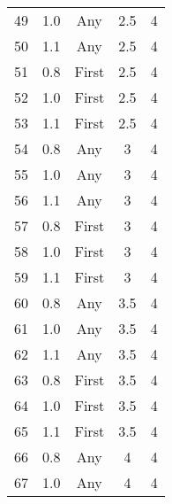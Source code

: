 \begin{table}[H]
{\begin{tabular}{ccccc}
      49                &  1.0  & Any     &     2.5                           & 4                    \\ 
      50                &  1.1  & Any     &     2.5                           & 4                     \\ 
      51                &  0.8  & First   &     2.5                           & 4                   \\ 
      52                &  1.0  & First   &     2.5                           & 4                   \\ 
      53                &  1.1  & First   &     2.5                           & 4                   \\ 
      54                &  0.8  & Any     &     3                           & 4                    \\ 
      55                &  1.0  & Any     &     3                           & 4                    \\ 
      56                &  1.1  & Any     &     3                           & 4                     \\ 
      57                &  0.8  & First   &     3                           & 4                   \\ 
      58                &  1.0  & First   &     3                           & 4                   \\ 
      59                &  1.1  & First   &     3                           & 4                   \\ 
      60                &  0.8  & Any     &     3.5                           & 4                    \\ 
      61                &  1.0  & Any     &     3.5                           & 4                    \\ 
      62                &  1.1  & Any     &     3.5                           & 4                     \\ 
      63                &  0.8  & First   &     3.5                           & 4                   \\ 
      64                &  1.0  & First   &     3.5                           & 4                   \\ 
      65                &  1.1  & First   &     3.5                           & 4                   \\ 
      66                &  0.8  & Any     &     4                           & 4                    \\ 
      67                &  1.0  & Any     &     4                           & 4                    \\ 

\end{tabular}}
\end{table}
